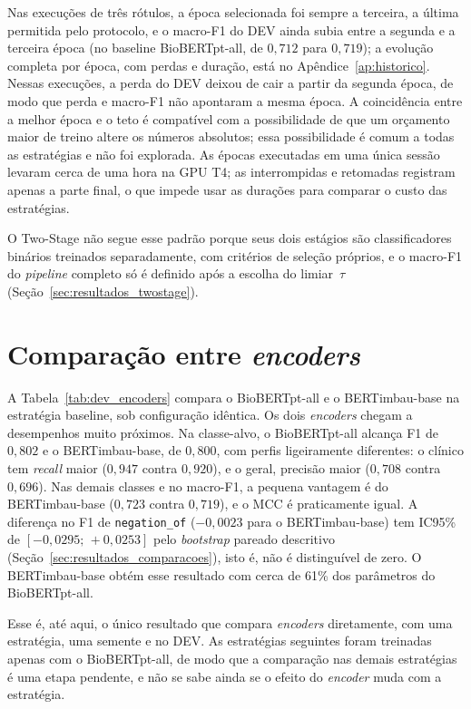 Nas execuções de três rótulos, a época selecionada foi sempre a terceira, a última
permitida pelo protocolo, e o macro-F1 do DEV ainda subia entre a segunda e a
terceira época (no baseline BioBERTpt-all, de $0{,}712$ para $0{,}719$); a evolução
completa por época, com perdas e duração, está no Apêndice~\ref{ap:historico}. Nessas
execuções, a perda do DEV deixou de cair a partir da segunda época, de modo que perda
e macro-F1 não apontaram a mesma época. A coincidência entre a melhor época e o teto
é compatível com a possibilidade de que um orçamento maior de treino altere os
números absolutos; essa possibilidade é comum a todas as estratégias e não foi
explorada. As épocas executadas em uma única sessão levaram cerca de uma hora na GPU
T4; as interrompidas e retomadas registram apenas a parte final, o que impede usar as
durações para comparar o custo das estratégias.

O Two-Stage não segue esse padrão porque seus dois estágios são classificadores
binários treinados separadamente, com critérios de seleção próprios, e o macro-F1 do
\emph{pipeline} completo só é definido após a escolha do limiar~$\tau$
(Seção~\ref{sec:resultados_twostage}).

\section{Comparação entre \emph{encoders}}
\label{sec:resultados_encoders}

A Tabela~\ref{tab:dev_encoders} compara o BioBERTpt-all e o BERTimbau-base na
estratégia baseline, sob configuração idêntica. Os dois \emph{encoders} chegam a
desempenhos muito próximos. Na classe-alvo, o BioBERTpt-all alcança F1 de $0{,}802$
e o BERTimbau-base, de $0{,}800$, com perfis ligeiramente diferentes: o clínico tem
\emph{recall} maior ($0{,}947$ contra $0{,}920$), e o geral, precisão maior
($0{,}708$ contra $0{,}696$). Nas demais classes e no macro-F1, a pequena vantagem é
do BERTimbau-base ($0{,}723$ contra $0{,}719$), e o MCC é praticamente igual. A
diferença no F1 de \texttt{negation\_of} ($-0{,}0023$ para o BERTimbau-base) tem IC95\% de
$[-0{,}0295;\,+0{,}0253]$ pelo \emph{bootstrap} pareado descritivo
(Seção~\ref{sec:resultados_comparacoes}), isto é, não é distinguível de zero. O
BERTimbau-base obtém esse resultado com cerca de 61\% dos parâmetros do
BioBERTpt-all.



Esse é, até aqui, o único resultado que compara \emph{encoders} diretamente, com uma
estratégia, uma semente e no DEV. As estratégias seguintes foram treinadas apenas com
o BioBERTpt-all, de modo que a comparação nas demais estratégias é uma etapa
pendente, e não se sabe ainda se o efeito do \emph{encoder} muda com a estratégia.

